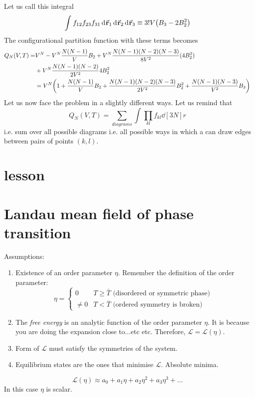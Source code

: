 \documentclass[../main/main.tex]{subfiles}
\begin{document}
Let us call this integral
\begin{equation}
  \int_{}^{} f_{12} f_{23} f_{31} \dd[]{\va{r}_1}  \dd[]{\va{r}_2}   \dd[]{\va{r}_3}
  \equiv  3! V  \qty( B_3 - 2 B_2^2  )
\end{equation}
The configurational partition function with these terms becomes
\begin{equation}
\begin{split}
Q_N (V,T) = &  V^N - V^N \frac{N(N-1)}{V} B_2 + V^N\frac{ N (N-1)(N-2)(N-3)}{8V^2} (4B_2^2)  \\
& + V^N \frac{N(N-1)(N-2)}{2V^2} 4B_2^2 \\
& = V^N \qty(1 + \frac{N(N-1)}{V} B_2 + \frac{N(N-1)(N-2)(N-3)}{2V^2} B_2^2 + \frac{N(N-1)(N-3)}{V^2} B_3)
\end{split}
\end{equation}
Let us now face the problem in a slightly different ways. Let us remind that
\begin{equation}
  Q_N (V,T) = \sum_{diagrams}^{} \int_{}^{} \prod_{kl}^{} f_{kl} \dd[3N]{r}
\end{equation}
i.e. sum over all possible diagrams i.e. all possible ways in which a can draw edges between pairs of points \( (k,l) \). 
\section{lesson}




\section{Landau mean field of phase transition}
Assumptions:
\begin{enumerate}
\item Existence of an order parameter \( \eta   \). Remember the definition of the order parameter:
\begin{equation}
  \eta   = \begin{cases}
    0 & T \ge \bar{T} \text{ (disordered or symmetric phase)}\\
    \neq 0 & T < \bar{T}  \text{ (ordered symmetry is broken)}
\end{cases}
\end{equation}
\item The \emph{free energy} is an analytic function of the order parameter \( \eta   \). It is because you are doing the expansion close to...etc etc. Therefore, \( \mathcal{L} = \mathcal{L} (\eta ) \).
\item Form of \( \mathcal{L} \) must satisfy the symmetries of the system.
\item Equilibrium states are the ones that minimise \( \mathcal{L} \). Absolute minima.
\end{enumerate}
\begin{equation}
  \mathcal{L} (\eta ) \approx a_0 + a_1 \eta + a_2 \eta ^2 + a_3 \eta ^3 + \dots
\end{equation}
In this case \( \eta  \) is scalar.
\end{document}
